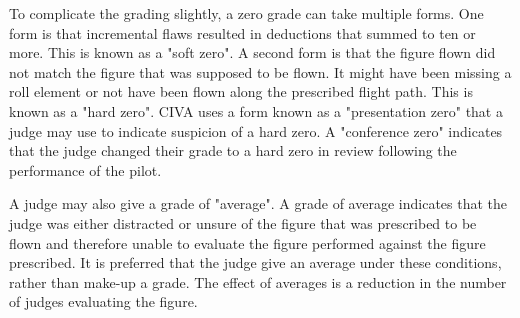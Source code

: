 To complicate the grading slightly, a zero grade can take multiple forms.
One form is that incremental flaws resulted in deductions that summed to
ten or more. This is known as a "soft zero". A second form is that the
figure flown did not match the figure that was supposed to be flown.
It might have been missing a roll element or not have been flown along
the prescribed flight path. This is known as a "hard zero". CIVA uses
a form known as a "presentation zero" that a judge may use to indicate
suspicion of a hard zero. A "conference zero" indicates that the judge
changed their grade to a hard zero in review following the performance
of the pilot.

A judge may also give a grade of "average". A grade of average indicates
that the judge was either distracted or unsure of the figure that was
prescribed to be flown and therefore unable to evaluate the figure performed
against the figure prescribed. It is preferred that the judge give an
average under these conditions, rather than make-up a grade.
The effect of averages is a reduction in the number of judges evaluating
the figure.
